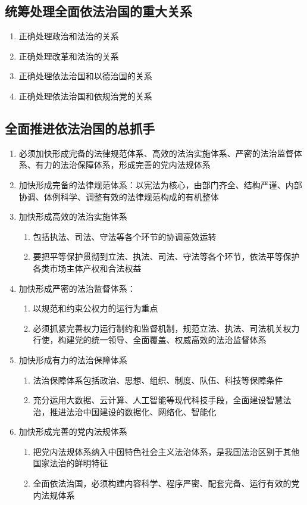 \documentclass{ctexart}
\numberwithin{figure}{section}
\numberwithin{equation}{section}
\begin{document}
    \subsection{统筹处理全面依法治国的重大关系}
    \begin{enumerate}
        \item 正确处理政治和法治的关系
        \item 正确处理改革和法治的关系
        \item 正确处理依法治国和以德治国的关系
        \item 正确处理依法治国和依规治党的关系
    \end{enumerate}
    \begin{tcolorbox}[colback=blue!5!white]
    \subsection{全面推进依法治国的总抓手}
    \begin{enumerate}
        \item 必须加快形成完备的法律规范体系、高效的法治实施体系、严密的法治监督体系、有力的法治保障体系，形成完善的党内法规体系
        \item 加快形成完备的法律规范体系：以宪法为核心，由部门齐全、结构严谨、内部协调、体例科学、调整有效的法律规范构成的有机整体
        \item 加快形成高效的法治实施体系
        \begin{enumerate}
            \item 包括执法、司法、守法等各个环节的协调高效运转
            \item 要把平等保护贯彻到立法、执法、司法、守法等各个环节，依法平等保护各类市场主体产权和合法权益
        \end{enumerate}
        \item 加快形成严密的法治监督体系：
        \begin{enumerate}
            \item 以规范和约束公权力的运行为重点
            \item 必须抓紧完善权力运行制约和监督机制，规范立法、执法、司法机关权力行使，构建党的统一领导、全面覆盖、权威高效的法治监督体系
        \end{enumerate}
        \item 加快形成有力的法治保障体系
        \begin{enumerate}
            \item 法治保障体系包括政治、思想、组织、制度、队伍、科技等保障条件
            \item 充分运用大数据、云计算、人工智能等现代科技手段，全面建设智慧法治，推进法治中国建设的数据化、网络化、智能化
        \end{enumerate}
        \item 加快形成完善的党内法规体系
        \begin{enumerate}
            \item 把党内法规体系纳入中国特色社会主义法治体系，是我国法治区别于其他国家法治的鲜明特征
            \item 全面依法治国，必须构建内容科学、程序严密、配套完备、运行有效的党内法规体系
        \end{enumerate}
    \end{enumerate}
    \end{tcolorbox}
\end{document}

